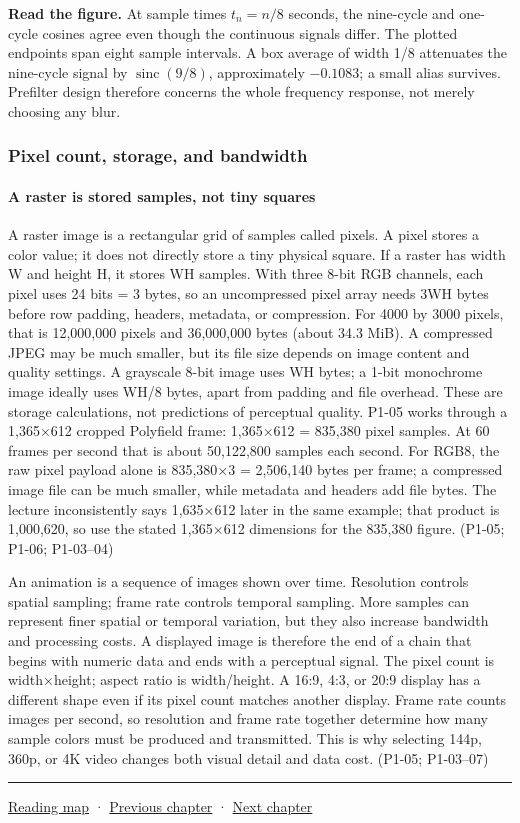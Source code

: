 \textbf{Read the figure.} At sample times \(t_n=n/8\) seconds, the nine-cycle and one-cycle cosines agree even though the continuous signals differ. The plotted endpoints span eight sample intervals. A box average of width 1/8 attenuates the nine-cycle signal by \(\operatorname{sinc}(9/8)\), approximately \(-0.1083\); a small alias survives. Prefilter design therefore concerns the whole frequency response, not merely choosing any blur.

\subsubsection{Pixel count, storage, and bandwidth}\label{pixel-count-storage-and-bandwidth}

\paragraph{A raster is stored samples, not tiny squares}\label{a-raster-is-stored-samples-not-tiny-squares}

A raster image is a rectangular grid of samples called pixels. A pixel stores a color value; it does not directly store a tiny physical square. If a raster has width W and height H, it stores WH samples. With three 8-bit RGB channels, each pixel uses 24 bits = 3 bytes, so an uncompressed pixel array needs 3WH bytes before row padding, headers, metadata, or compression. For 4000 by 3000 pixels, that is 12,000,000 pixels and 36,000,000 bytes (about 34.3 MiB). A compressed JPEG may be much smaller, but its file size depends on image content and quality settings. A grayscale 8-bit image uses WH bytes; a 1-bit monochrome image ideally uses WH/8 bytes, apart from padding and file overhead. These are storage calculations, not predictions of perceptual quality. P1-05 works through a 1,365×612 cropped Polyfield frame: 1,365×612 = 835,380 pixel samples. At 60 frames per second that is about 50,122,800 samples each second. For RGB8, the raw pixel payload alone is 835,380×3 = 2,506,140 bytes per frame; a compressed image file can be much smaller, while metadata and headers add file bytes. The lecture inconsistently says 1,635×612 later in the same example; that product is 1,000,620, so use the stated 1,365×612 dimensions for the 835,380 figure. (P1-05; P1-06; P1-03--04)

An animation is a sequence of images shown over time. Resolution controls spatial sampling; frame rate controls temporal sampling. More samples can represent finer spatial or temporal variation, but they also increase bandwidth and processing costs. A displayed image is therefore the end of a chain that begins with numeric data and ends with a perceptual signal. The pixel count is width×height; aspect ratio is width/height. A 16:9, 4:3, or 20:9 display has a different shape even if its pixel count matches another display. Frame rate counts images per second, so resolution and frame rate together determine how many sample colors must be produced and transmitted. This is why selecting 144p, 360p, or 4K video changes both visual detail and data cost. (P1-05; P1-03--07)

\begin{center}\rule{0.5\linewidth}{0.5pt}\end{center}

\href{Chapter\%20Edition/02\%20-\%20Graphics\%20Vision\%20and\%20XR/00\%20-\%20Reading\%20Map}{Reading map} · \hyperref[03-visual-computing-i-ch002]{Previous chapter} · \hyperref[03-visual-computing-i-ch004]{Next chapter}
